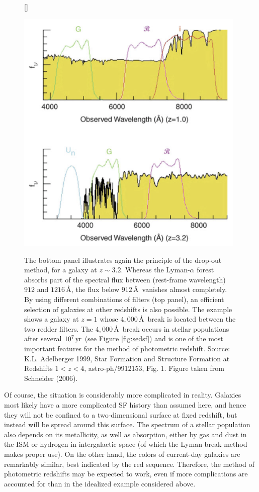 \documentclass[a4paper,10pt]{article}
\begin{document}
\begin{figure}[h]
    [\FBwidth]
    {\caption{\footnotesize{The bottom panel illustrates again the principle of the drop-out method, for a galaxy at $z\sim3.2$. Whereas the Lyman-$\alpha$ forest absorbs part of the spectral flux between (rest-frame wavelength) $912$ and $1216$\,\AA, the flux below $912$\,\AA~vanishes almost completely. By using different combinations of filters (top panel), an efficient selection of galaxies at other redshifts is also possible. The example shows a galaxy at $z=1$ whose $4,000$\,\AA~break is located between the two redder filters. The $4,000$\,\AA~break occurs in stellar populations after several $10^7\,{\rm yr}$ (see Figure \ref{fig:sedsf}) and is one of the most important features for the method of photometric redshift. Source: K.L. Adelberger 1999, Star Formation and Structure Formation at Redshifts $1<z<4$, astro-ph/9912153, Fig. 1. Figure taken from Schneider (2006).}}
    \label{fig:photredshifts}}
    {\includegraphics[width=11cm]{figures/PhotRedshifts.png}}
\end{figure}

{\noindent}Of course, the situation is considerably more complicated in reality. Galaxies most likely have a more complicated SF history than assumed here, and hence they will not be confined to a two-dimensional surface at fixed redshift, but instead will be spread around this surface. The spectrum of a stellar population also depends on its metallicity, as well as absorption, either by gas and dust in the ISM or hydrogen in intergalactic space (of which the Lyman-break method makes proper use). On the other hand, the colors of current-day galaxies are remarkably similar, best indicated by the red sequence. Therefore, the method of photometric redshifts may be expected to work, even if more complications are accounted for than in the idealized example considered above.
\end{document}
